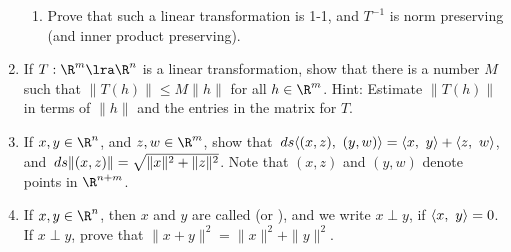 \begin{enumerate}
\begin{enumerate}
	\item	Prove that such a linear transformation is 1-1, and $T^{-1}$ is
	norm preserving (and inner product preserving).
\end{enumerate}

\item\label{bddlin}	If $T:\R^m\lra\R^n$ is a linear transformation, show that there is a
number $M$ such that $\|T(h)\|\leq M\|h\|$ for all $h\in\R^m$.  Hint: Estimate
$\|T(h)\|$ in terms of $\|h\|$ and the entries in the matrix for $T$.

\item	If $x,y\in\R^n$, and $z,w\in\R^m$, show that $\,ds{\left\langle {(x,z)},~{(y,w)} \right\rangle} = {\left\langle {x},~{y} \right\rangle}
+ {\left\langle {z},~{w} \right\rangle}$, and $\,ds\|(x,z)\| = \sqrt{\|x\|^2 + \|z\|^2}$.  Note that $(x,z)$ and
$(y,w)$ denote points in $\R^{n+m}$.

\item	If $x,y\in\R^n$, then $x$ and $y$ are called  (or
), and we write $x\perp y$, if ${\left\langle {x},~{y} \right\rangle} = 0$.  If $x\perp y$,
prove that $\|x+y\|^2 = \|x\|^2 + \|y\|^2$.

\end{enumerate}


